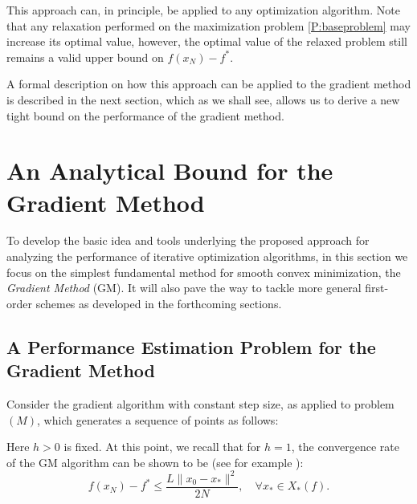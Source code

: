 \documentclass[12pt]{article}
\numberwithin{equation}{section}
\theoremstyle{definition}
\theoremstyle{remark}
\begin{document}
This approach can, in principle, be applied to any optimization algorithm. Note that any
relaxation performed on the maximization problem \eqref{P:baseproblem} may increase its
optimal value, however, the optimal value of the relaxed problem still remains a valid upper
bound on $f(x_N)-f^\ast$.

A formal description on how this approach can be applied to the gradient method is described
in the next section, which as we shall see, allows us to derive a new tight bound on the
performance of the gradient method.


\section{An Analytical Bound for the Gradient Method}\label{S:analyticalbound}

 To develop the basic idea and tools underlying the proposed approach
for analyzing the performance of iterative optimization algorithms, in this section we focus
on the simplest fundamental method for smooth convex minimization, the {\em Gradient Method}
(GM). It will also pave the way to tackle more general first-order schemes as developed in the
forthcoming sections.

\subsection{A Performance Estimation Problem for the Gradient Method}
Consider the gradient algorithm with constant step size, as applied to problem $(M)$, which generates a sequence of
points as follows:\medskip

\bigskip

Here $h>0$ is fixed.
At this point, we recall that for $h=1$, the convergence rate of the GM algorithm can be shown
to be (see for example \cite{nest-book-04,beck-tebo-fista09}):
\begin{equation}\label{E:oldgradientbound}
    f(x_N)-f^\ast \leq \frac{L\|x_0-x_\ast\|^2}{2N}, \quad \forall x_\ast \in X_\ast(f).
\end{equation}
\medskip
\end{document}
